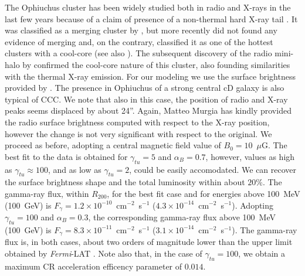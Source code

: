 \documentclass[traditabstract]{aa}
\begin{document}
The Ophiuchus cluster has been widely studied both in radio and X-rays in the last few years because of a claim of presence of a non-thermal hard X-ray tail \citep{2008A&A...479...27E,2008PASJ...60.1133F,2009A&A...499..371G,2009A&A...499..679M,2009MNRAS.396.2237P,2009A&A...508.1161N,2010A&A...514A..76M,2010MNRAS.405.1624M}. It was classified as a merging cluster by \cite{2001PASJ...53..605W}, but more recently \cite{2008PASJ...60.1133F} did not found any evidence of merging and, on the contrary, classified it as one of the hottest clusters with a  cool-core (see also \citealp{2010MNRAS.405.1624M}). The subsequent discovery of the radio mini-halo by \cite{2009A&A...499..371G} confirmed the cool-core nature of this cluster, also founding similarities with the thermal X-ray emission. For our modeling we use the surface brightness provided by \cite{2009A&A...499..679M}.  The presence in Ophiuchus of a strong central cD galaxy is also typical of CCC.
We note that also in this case, the position of radio and X-ray peaks seems displaced by about 24''. Again, Matteo Murgia has kindly provided the radio surface brightness computed with respect to the \cite{2002ApJ...567..716R} X-ray position, however the change is not very significant with respect to the original. 
We proceed as before, adopting a central magnetic field value of $B_{0}=10$~$\mu$G.
The best fit to the data is obtained for $\gamma_{tu}=5$ and $\alpha_B=0.7$, however, values as high as $\gamma_{tu} \approx 100$, and as low as $\gamma_{tu}=2$, could be easily accomodated. We can recover the surface brightness shape and the total luminosity within about $20\%$. The gamma-ray flux, within $R_{200}$, for the best fit case and for energies above 100~MeV (100~GeV) is $F_{\gamma} = 1.2 \times 10^{-10}$~cm$^{-2}$~s$^{-1}$ ($4.3 \times 10^{-14}$~cm$^{-2}$~s$^{-1}$). Adopting $\gamma_{tu}=100$ and $\alpha_B=0.3$, the corresponding gamma-ray flux above 100~MeV (100~GeV) is $F_{\gamma} = 8.3 \times 10^{-11}$~cm$^{-2}$~s$^{-1}$ ($3.1 \times 10^{-14}$~cm$^{-2}$~s$^{-1}$). The gamma-ray flux is, in both cases, about two orders of magnitude lower than the upper limit obtained by \emph{Fermi}-LAT \citep{2010ApJ...717L..71A}. Note also that, in the case of $\gamma_{tu} = 100$, we obtain a maximum CR acceleration efficency parameter of $0.014$. 
\end{document}
